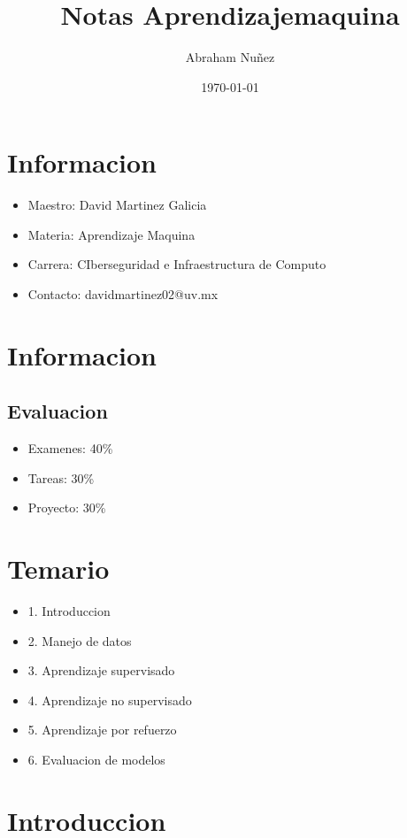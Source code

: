 \documentclass[11pt]{article}
\author{Abraham Nuñez}
\date{\today}
\title{Notas Aprendizajemaquina}
\begin{document}
\maketitle
\tableofcontents

\section{Informacion}
\label{sec:org4f7593c}
\begin{itemize}
\item Maestro: David Martinez Galicia
\item Materia: Aprendizaje Maquina
\item Carrera: CIberseguridad e Infraestructura de Computo
\item Contacto: davidmartinez02@uv.mx
\end{itemize}
\section{Informacion}
\label{sec:orgb0a7e25}
\subsection{Evaluacion}
\label{sec:orgf0ff750}
\begin{itemize}
\item Examenes: 40\%
\item Tareas: 30\%
\item Proyecto: 30\%
\end{itemize}
\section{Temario}
\label{sec:orge341fb2}
\begin{itemize}
\item 1. Introduccion
\item 2. Manejo de datos
\item 3. Aprendizaje supervisado
\item 4. Aprendizaje no supervisado
\item 5. Aprendizaje por refuerzo
\item 6. Evaluacion de modelos
\end{itemize}
\section{Introduccion}
\label{sec:org384c1c5}
\end{document}
